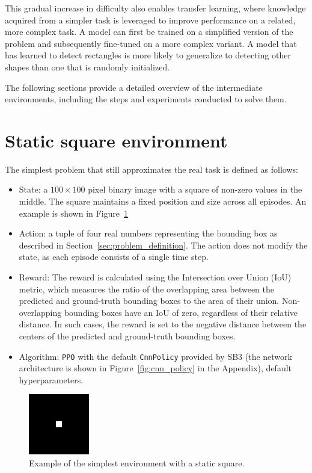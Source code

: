 \documentclass[
  digital,     %
  oneside,     %
  nosansbold,  %
  nocolorbold, %
  lof,         %
  lot,         %
]{fithesis4}
\begin{document}
This gradual increase in difficulty also enables transfer learning, where knowledge acquired from a simpler task is leveraged to improve performance on a related, more complex task. A model can first be trained on a simplified version of the problem and subsequently fine-tuned on a more complex variant. A model that has learned to detect rectangles is more likely to generalize to detecting other shapes than one that is randomly initialized.

The following sections provide a detailed overview of the intermediate environments, including the steps and experiments conducted to solve them.

\section{Static square environment}
The simplest problem that still approximates the real task is defined as follows:
\begin{itemize}
    \item State: a $100\times100$ pixel binary image with a square of non-zero values in the middle. The square maintains a fixed position and size across all episodes. An example is shown in Figure~\ref{fig:env0}
    \item Action: a tuple of four real numbers representing the bounding box as described in Section~\ref{sec:problem_definition}. The action does not modify the state, as each episode consists of a single time step.
    \item Reward: The reward is calculated using the Intersection over Union (IoU) metric, which measures the ratio of the overlapping area between the predicted and ground-truth bounding boxes to the area of their union. Non-overlapping bounding boxes have an IoU of zero, regardless of their relative distance. In such cases, the reward is set to the negative distance between the centers of the predicted and ground-truth bounding boxes.
    \item Algorithm: \texttt{PPO} with the default \texttt{CnnPolicy} provided by SB3 (the network architecture is shown in Figure~\ref{fig:cnn_policy} in the Appendix), default hyperparameters.
\end{itemize}

\begin{figure}
    \includegraphics[width=0.25\linewidth]{env_examples/env0.jpg}
    \caption{Example of the simplest environment with a static square.}
    \label{fig:env0}
\end{figure}
\end{document}
